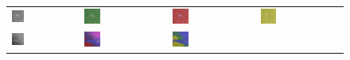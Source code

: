 \begin{figure}[h!]
	\begin{tabular}{C{0.24\textwidth}C{0.24\textwidth}C{0.24\textwidth}C{0.24\textwidth}}
		\includegraphics[width=0.2\textwidth]{images/p03/p03_01.png} &
		\includegraphics[width=0.2\textwidth]{images/gen/fully_connected/p03_01.png_0.png} &
		\includegraphics[width=0.2\textwidth]{images/gen/fully_connected/p03_01.png_1.png} &
		\includegraphics[width=0.2\textwidth]{images/gen/fully_connected/p03_01.png_2.png} \\
		\includegraphics[width=0.2\textwidth]{images/p03/p03_02.png} &
		\includegraphics[width=0.2\textwidth]{images/gen/fully_connected/p03_02.png_0.png} &
		\includegraphics[width=0.2\textwidth]{images/gen/fully_connected/p03_02.png_1.png} &

\end{tabular}
\end{figure}
